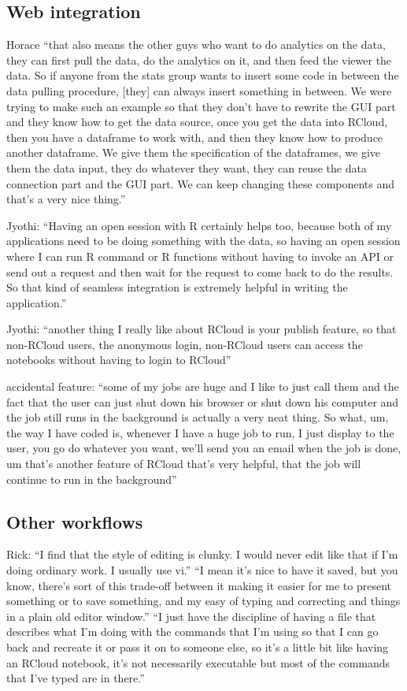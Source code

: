\subsection{Web integration}
Horace ``that also means the other guys who want to do analytics on the data,
they can first pull the data, do the analytics on it, and then feed the viewer
the data. So if anyone from the stats group wants to insert some code in between
the data pulling procedure, [they] can always insert something in between. We
were trying to make such an example so that they don't have to rewrite the GUI
part and they know how to get the data source, once you get the data into
RCloud, then you have a dataframe to work with, and then they know how to
produce another dataframe. We give them the specification of the dataframes, we
give them the data input, they do whatever they want, they can reuse the data
connection part and the GUI part. We can keep changing these components and
that's a very nice thing.''

Jyothi: ``Having an open session with R certainly helps too, because both of my
applications need to be doing something with the data, so having an open session
where I can run R command or R functions without having to invoke an API or send
out a request and then wait for the request to come back to do the results.  So
that kind of seamless integration is extremely helpful in writing the
application.''

Jyothi: ``another thing I really like about RCloud is your publish feature, so
that non-RCloud users, the anonymous login, non-RCloud users can access the
notebooks without having to login to RCloud''

accidental feature: ``some of my jobs are huge and I like to just call them and
the fact that the user can just shut down his browser or shut down his computer
and the job still runs in the background is actually a very neat thing. So what,
um, the way I have coded is, whenever I have a huge job to run, I just display
to the user, you go do whatever you want, we'll send you an email when the job
is done, um that's another feature of RCloud that's very helpful, that the job
will continue to run in the background''


\subsection{Other workflows}
Rick: ``I find that the style of editing is clunky. I would never edit like that
if I'm doing ordinary work. I usually use vi.'' ``I mean it's nice to have it
saved, but you know, there's sort of this trade-off between it making it easier
for me to present something or to save something, and my easy of typing and
correcting and things in a plain old editor window.'' ``I just have the
discipline of having a file that describes what I'm doing with the commands that
I'm using so that I can go back and recreate it or pass it on to someone else,
so it's a little bit like having an RCloud notebook, it's not necessarily
executable but most of the commands that I've typed are in there.''

